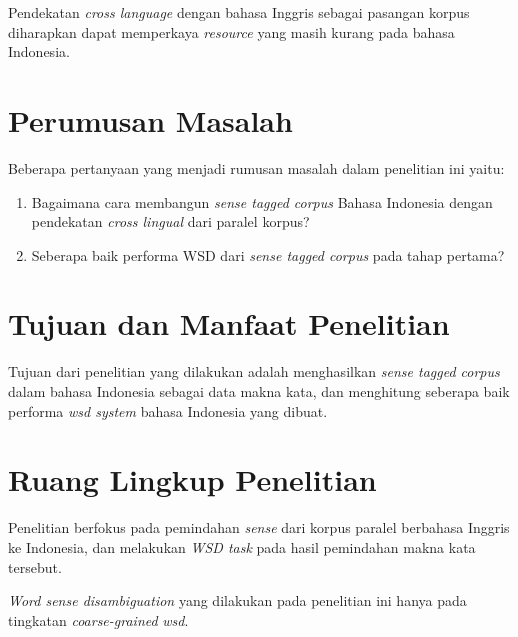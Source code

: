 Pendekatan \textit{cross language} dengan bahasa Inggris sebagai pasangan korpus diharapkan dapat memperkaya \textit{resource} yang masih kurang pada bahasa Indonesia. 
\section{Perumusan Masalah}
Beberapa pertanyaan yang menjadi rumusan masalah dalam penelitian ini yaitu:
\begin{enumerate}
	\item Bagaimana cara membangun \textit{sense tagged corpus} Bahasa Indonesia dengan pendekatan \textit{cross lingual} dari paralel korpus?
	\item Seberapa baik performa WSD dari \textit{sense tagged corpus} pada tahap pertama?
\end{enumerate}

\section{Tujuan dan Manfaat Penelitian}
Tujuan dari penelitian yang dilakukan adalah menghasilkan \textit{sense tagged corpus} dalam bahasa Indonesia sebagai data makna kata, dan menghitung seberapa baik performa \textit{wsd system} bahasa Indonesia yang dibuat.

\section{Ruang Lingkup Penelitian}
Penelitian berfokus pada pemindahan \textit{sense} dari korpus paralel berbahasa Inggris ke Indonesia, dan melakukan \textit{WSD task} pada hasil pemindahan makna kata tersebut.

\textit{Word sense disambiguation} yang dilakukan pada penelitian ini hanya pada tingkatan \textit{coarse-grained} \textit{wsd}.

